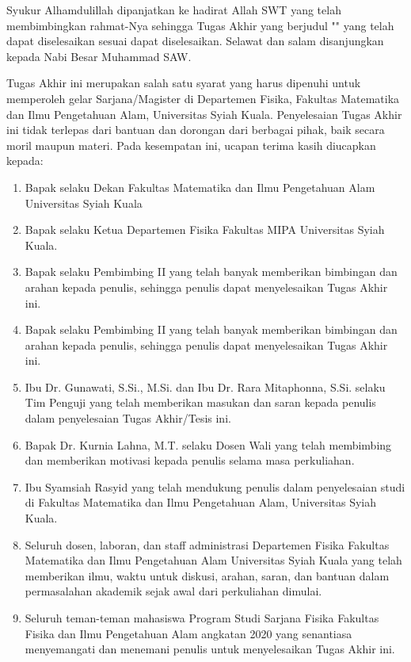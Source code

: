 \preface %
\makeatletter
Syukur Alhamdulillah dipanjatkan ke hadirat Allah SWT yang telah membimbingkan rahmat-Nya sehingga Tugas Akhir yang berjudul "\textit{\@judul}" yang telah dapat diselesaikan sesuai dapat diselesaikan. Selawat dan salam disanjungkan kepada Nabi Besar Muhammad SAW.

Tugas Akhir ini merupakan salah satu syarat yang harus dipenuhi untuk memperoleh gelar Sarjana/Magister di Departemen Fisika, Fakultas Matematika dan Ilmu Pengetahuan Alam, Universitas Syiah Kuala. Penyelesaian Tugas Akhir ini tidak terlepas dari bantuan dan dorongan dari berbagai pihak, baik secara moril maupun materi. Pada kesempatan ini, ucapan terima kasih diucapkan kepada:

\begin{enumerate}
    \item Bapak \@dekan \textit{ }selaku Dekan Fakultas Matematika dan Ilmu Pengetahuan Alam Universitas Syiah Kuala
    \item Bapak \@kaprodi \textit{ }selaku Ketua Departemen Fisika Fakultas MIPA Universitas Syiah Kuala.
    \item Bapak \@firstsupervisor \textit{ }selaku  Pembimbing II yang telah banyak memberikan bimbingan dan arahan kepada penulis, sehingga penulis dapat menyelesaikan Tugas Akhir ini.
    \item Bapak \@secondsupervisor   \textit{ }selaku  Pembimbing II yang telah banyak memberikan bimbingan dan arahan kepada penulis, sehingga penulis dapat menyelesaikan Tugas Akhir ini.
    \item Ibu Dr. Gunawati, S.Si., M.Si. dan Ibu Dr. Rara Mitaphonna, S.Si. selaku Tim Penguji yang telah memberikan masukan dan saran kepada penulis dalam penyelesaian Tugas Akhir/Tesis ini.
    \item Bapak Dr. Kurnia Lahna, M.T. selaku Dosen Wali yang telah membimbing dan memberikan motivasi kepada penulis selama masa perkuliahan.
    \item Ibu Syamsiah Rasyid yang telah mendukung penulis dalam penyelesaian studi di Fakultas Matematika dan Ilmu Pengetahuan Alam, Universitas Syiah Kuala.
    \item Seluruh dosen, laboran, dan staff administrasi Departemen Fisika Fakultas Matematika dan Ilmu Pengetahuan Alam Universitas Syiah Kuala yang telah memberikan ilmu, waktu untuk diskusi, arahan, saran, dan bantuan dalam permasalahan akademik sejak awal dari perkuliahan dimulai.
    \item Seluruh teman-teman mahasiswa Program Studi Sarjana Fisika Fakultas Fisika dan Ilmu Pengetahuan Alam angkatan 2020 yang senantiasa menyemangati dan menemani penulis untuk menyelesaikan Tugas Akhir ini.
\end{enumerate}

